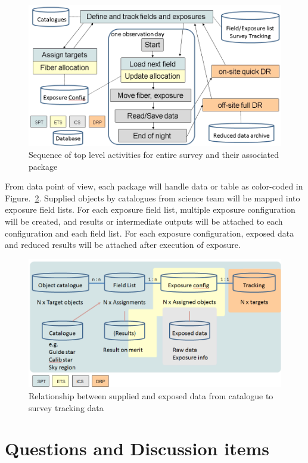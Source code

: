 \documentclass[a4paper,notitlepage]{article}
\begin{document}
\begin{figure}[htb]
  \begin{center}
    \includegraphics[width=.75\linewidth]{sciops-scireq-slide-softcoord.png}
  \end{center}
  \caption{Sequence of top level activities for entire survey and 
    their associated package}
  \label{fig:sciops-scireq-slide-softcoord}
\end{figure}

From data point of view, each package will handle data or table as
color-coded in Figure.~\ref{fig:sciops-scireq-slide-data}. Supplied
objects by catalogues from science team will be mapped into exposure
field lists. For each exposure field list, multiple exposure
configuration will be created, and results or intermediate outputs will
be attached to each configuration and each field list.  For each
exposure configuration, exposed data and reduced results will be
attached after execution of exposure.

\begin{figure}[htb]
  \begin{center}
    \includegraphics[width=.75\linewidth]{sciops-scireq-slide-data.png}
  \end{center}
  \caption{Relationship between supplied and exposed data from catalogue
    to survey tracking data} \label{fig:sciops-scireq-slide-data}
\end{figure}

\section{Questions and Discussion items}
\end{document}
